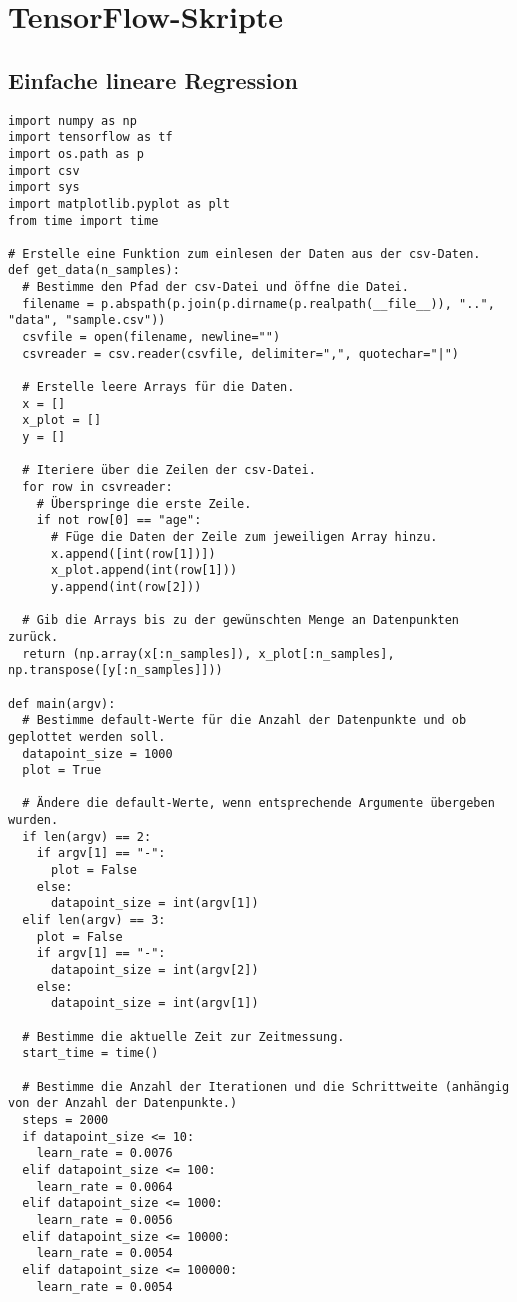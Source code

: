 \chapter{TensorFlow-Skripte}
\label{appendix:C}

\section{Einfache lineare Regression}
\label{appendix:C:1}

\begin{verbatim}
import numpy as np
import tensorflow as tf
import os.path as p
import csv
import sys
import matplotlib.pyplot as plt
from time import time

# Erstelle eine Funktion zum einlesen der Daten aus der csv-Daten.
def get_data(n_samples):
  # Bestimme den Pfad der csv-Datei und öffne die Datei.
  filename = p.abspath(p.join(p.dirname(p.realpath(__file__)), "..", "data", "sample.csv"))
  csvfile = open(filename, newline="")
  csvreader = csv.reader(csvfile, delimiter=",", quotechar="|")

  # Erstelle leere Arrays für die Daten.
  x = []
  x_plot = []
  y = []

  # Iteriere über die Zeilen der csv-Datei.
  for row in csvreader:
    # Überspringe die erste Zeile.
    if not row[0] == "age":
      # Füge die Daten der Zeile zum jeweiligen Array hinzu.
      x.append([int(row[1])])
      x_plot.append(int(row[1]))
      y.append(int(row[2]))

  # Gib die Arrays bis zu der gewünschten Menge an Datenpunkten zurück.
  return (np.array(x[:n_samples]), x_plot[:n_samples], np.transpose([y[:n_samples]]))

def main(argv):
  # Bestimme default-Werte für die Anzahl der Datenpunkte und ob geplottet werden soll.
  datapoint_size = 1000
  plot = True

  # Ändere die default-Werte, wenn entsprechende Argumente übergeben wurden.
  if len(argv) == 2:
    if argv[1] == "-":
      plot = False
    else:
      datapoint_size = int(argv[1])
  elif len(argv) == 3:
    plot = False
    if argv[1] == "-":
      datapoint_size = int(argv[2])
    else:
      datapoint_size = int(argv[1])

  # Bestimme die aktuelle Zeit zur Zeitmessung.
  start_time = time()

  # Bestimme die Anzahl der Iterationen und die Schrittweite (anhängig von der Anzahl der Datenpunkte.)
  steps = 2000
  if datapoint_size <= 10:
    learn_rate = 0.0076
  elif datapoint_size <= 100:
    learn_rate = 0.0064
  elif datapoint_size <= 1000:
    learn_rate = 0.0056
  elif datapoint_size <= 10000:
    learn_rate = 0.0054
  elif datapoint_size <= 100000:
    learn_rate = 0.0054


\end{verbatim}
